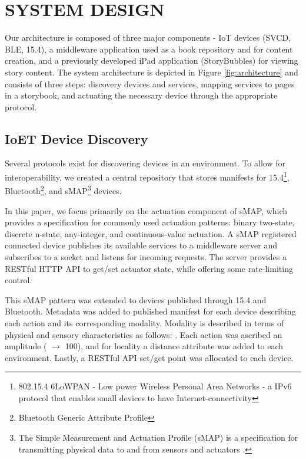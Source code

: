 \documentclass{sigchi}
\newcommand*{\quoted}[1]{{\small{\fontfamily{cmss}\selectfont{#1}}}}
\begin{document}
\section{SYSTEM DESIGN}
Our architecture is composed of three major components - IoT devices (SVCD, BLE, 15.4), a middleware application used as a book repository and for content creation, and a previously developed iPad application (StoryBubbles) for viewing story content. The system architecture is depicted in Figure \ref{fig:architecture} and consists of three steps: discovery devices and services, mapping services to pages in a storybook, and actuating the necessary device through the appropriate protocol. 

\subsection{IoET Device Discovery} 
Several protocols exist for discovering devices in an environment. To allow for interoperability, we created a central repository that stores manifests for 15.4\footnote{802.15.4 6LoWPAN - Low power Wireless Personal Area Networks - a IPv6 protocol that enables small devices to have Internet-connectivity},
Bluetooth\footnote{Bluetooth Generic Attribute Profile},
and sMAP\footnote{The Simple Measurement and Actuation Profile (sMAP) is a specification for transmitting physical data to and from sensors and actuators \cite{dawson-haggerty_smap:_2010}.} 
devices. 

In this paper, we focus primarily on the actuation component of sMAP, which provides a specification for commonly used actuation patterns: binary two-state, discrete n-state, any-integer, and continuous-value actuation. A sMAP registered connected device publishes its available services to a middleware server and subscribes to a socket and listens for incoming requests. The server provides a RESTful HTTP API to get/set actuator state, while offering some rate-limiting control. 

This sMAP pattern was extended to devices published through 15.4 and Bluetooth. 
Metadata was added to published manifest for each device describing each action and its corresponding modality. 
Modality is described in terms of physical and sensory characteristics as follows: \quoted{$\langle$ light, air, sound, smell, heat, taste, motion $\rangle$}.
Each action was ascribed an amplitude (\quoted{on} $\rightarrow$ 100), and for locality a distance attribute was added to each environment. Lastly, a RESTful API set/get point was allocated to each device.
\end{document}
